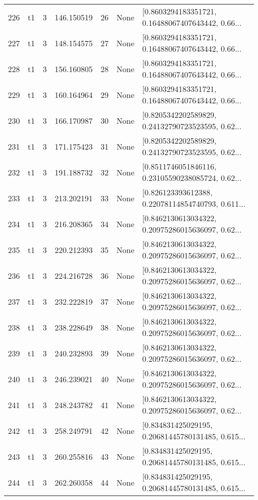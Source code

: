 \begin{tabular}{lllrlll}
226 &  t1 &   3 &  146.150519 &   26 &  None &  [0.8603294183351721, 0.16488067407643442, 0.66... \\
227 &  t1 &   3 &  148.154575 &   27 &  None &  [0.8603294183351721, 0.16488067407643442, 0.66... \\
228 &  t1 &   3 &  156.160805 &   28 &  None &  [0.8603294183351721, 0.16488067407643442, 0.66... \\
229 &  t1 &   3 &  160.164964 &   29 &  None &  [0.8603294183351721, 0.16488067407643442, 0.66... \\
230 &  t1 &   3 &  166.170987 &   30 &  None &  [0.8205342202589829, 0.24132790723523595, 0.62... \\
231 &  t1 &   3 &  171.175423 &   31 &  None &  [0.8205342202589829, 0.24132790723523595, 0.62... \\
232 &  t1 &   3 &  191.188732 &   32 &  None &  [0.8511746051846116, 0.23105590238085724, 0.62... \\
233 &  t1 &   3 &  213.202191 &   33 &  None &  [0.826123393612388, 0.22078114854740793, 0.611... \\
234 &  t1 &   3 &  216.208365 &   34 &  None &  [0.8462130613034322, 0.20975286015636097, 0.62... \\
235 &  t1 &   3 &  220.212393 &   35 &  None &  [0.8462130613034322, 0.20975286015636097, 0.62... \\
236 &  t1 &   3 &  224.216728 &   36 &  None &  [0.8462130613034322, 0.20975286015636097, 0.62... \\
237 &  t1 &   3 &  232.222819 &   37 &  None &  [0.8462130613034322, 0.20975286015636097, 0.62... \\
238 &  t1 &   3 &  238.228649 &   38 &  None &  [0.8462130613034322, 0.20975286015636097, 0.62... \\
239 &  t1 &   3 &  240.232893 &   39 &  None &  [0.8462130613034322, 0.20975286015636097, 0.62... \\
240 &  t1 &   3 &  246.239021 &   40 &  None &  [0.8462130613034322, 0.20975286015636097, 0.62... \\
241 &  t1 &   3 &  248.243782 &   41 &  None &  [0.8462130613034322, 0.20975286015636097, 0.62... \\
242 &  t1 &   3 &  258.249791 &   42 &  None &  [0.834831425029195, 0.20681445780131485, 0.615... \\
243 &  t1 &   3 &  260.255816 &   43 &  None &  [0.834831425029195, 0.20681445780131485, 0.615... \\
244 &  t1 &   3 &  262.260358 &   44 &  None &  [0.834831425029195, 0.20681445780131485, 0.615... \\

\end{tabular}
